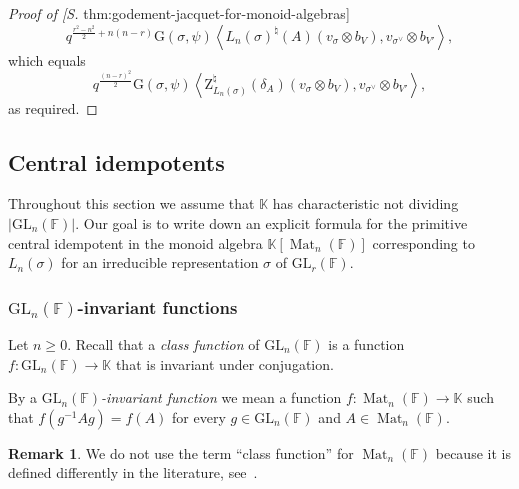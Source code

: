 \documentclass[12pt, reqno]{amsart}
\theoremstyle{definition}
\newtheorem{remark}[theorem]{Remark}
\newcommand{\Cref}[1]{\zcref[S]{#1}}
\newcommand{\coefficientsField}{\mathbb{K}}
\newcommand{\sizeof}[1]{\left|#1\right|}
\newcommand{\naturalZetaIntegral}{\mathrm{Z}^{\natural}}
\newcommand{\innerproduct}[2]{\left\langle #1,#2\right\rangle}
\newcommand{\fieldCharacter}{\psi}
\newcommand{\GL}{\mathrm{GL}}
\newcommand{\finiteField}{\mathbb{F}}
\newcommand{\squareMatrix}{\operatorname{Mat}}
\newcommand{\GaussSumScalar}[2]{\mathrm{G}\left(#1, #2\right)}
\begin{document}
\begin{proof}[Proof of \Cref{thm:godement-jacquet-for-monoid-algebras}]
		\begin{displaymath}
			q^{\frac{r^2-n^2}{2} + n\left(n-r\right)} \GaussSumScalar{\sigma}{\fieldCharacter} \innerproduct{L_n\left(\sigma\right)^{\natural}\left(A\right) \left(v_{\sigma} \otimes b_V\right)}{v_{\sigma^{\vee}} \otimes b_{V'}},
		\end{displaymath}
		which equals
		\begin{displaymath}
			q^{\frac{\left(n-r\right)^2}{2}} \GaussSumScalar{\sigma}{\fieldCharacter} \innerproduct{\naturalZetaIntegral_{L_n\left(\sigma\right)}\left(\delta_A\right) \left(v_{\sigma} \otimes b_V\right)}{v_{\sigma^{\vee}} \otimes b_{V'}},
		\end{displaymath}
		as required.
	\end{proof}	
			
	\subsection{Central idempotents}
	Throughout this section we assume that $\coefficientsField$ has characteristic not dividing $\sizeof{\GL_n\left(\finiteField\right)}$. Our goal is to write down an explicit formula for the primitive central idempotent in the monoid algebra $\coefficientsField\left[\squareMatrix_n\left(\finiteField\right)\right]$ corresponding to $L_n\left(\sigma\right)$ for an irreducible representation $\sigma$ of $\GL_r\left(\finiteField\right)$.
	
	\subsubsection{$\GL_n\left(\finiteField\right)$-invariant functions}
	Let $n \ge 0$. Recall that a \emph{class function} of $\GL_n\left(\finiteField\right)$ is a function $f \colon \GL_n\left(\finiteField\right) \to \coefficientsField$ that is invariant under conjugation.
	
	By a \emph{$\GL_n\left(\finiteField\right)$-invariant function} we mean a function $f \colon \squareMatrix_n\left(\finiteField\right) \to \coefficientsField$ such that $f\left(g^{-1} A g\right) = f\left(A\right)$ for every $g \in \GL_n\left(\finiteField\right)$ and $A \in \squareMatrix_n\left(\finiteField\right)$.
	
	\begin{remark}
		We do not use the term ``class function'' for $\squareMatrix_n\left(\finiteField\right)$ because it is defined differently in the literature, see~\cite[Chapter 7]{Steinberg2016}.
	\end{remark}
	
\end{document}
